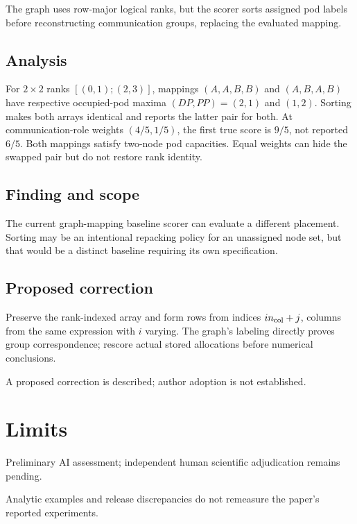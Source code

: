 \documentclass[11pt]{article}
\begin{document}
The graph uses row-major logical ranks, but the scorer sorts assigned pod labels before reconstructing communication groups, replacing the evaluated mapping.

\subsection*{Analysis}

For \(2\times2\) ranks \([(0,1);(2,3)]\), mappings \((A,A,B,B)\) and \((A,B,A,B)\) have respective occupied-pod maxima \((DP,PP)=(2,1)\) and \((1,2)\). Sorting makes both arrays identical and reports the latter pair for both. At communication-role weights \((4/5,1/5)\), the first true score is \(9/5\), not reported \(6/5\). Both mappings satisfy two-node pod capacities. Equal weights can hide the swapped pair but do not restore rank identity.

\subsection*{Finding and scope}

The current graph-mapping baseline scorer can evaluate a different placement. Sorting may be an intentional repacking policy for an unassigned node set, but that would be a distinct baseline requiring its own specification.

\subsection*{Proposed correction}

Preserve the rank-indexed array and form rows from indices \(i n_{\rm col}+j\), columns from the same expression with \(i\) varying. The graph’s labeling directly proves group correspondence; rescore actual stored allocations before numerical conclusions.

A proposed correction is described; author adoption is not established.

\section*{Limits}

Preliminary AI assessment; independent human scientific adjudication remains pending.\par

Analytic examples and release discrepancies do not remeasure the paper’s reported experiments.\par
\end{document}

